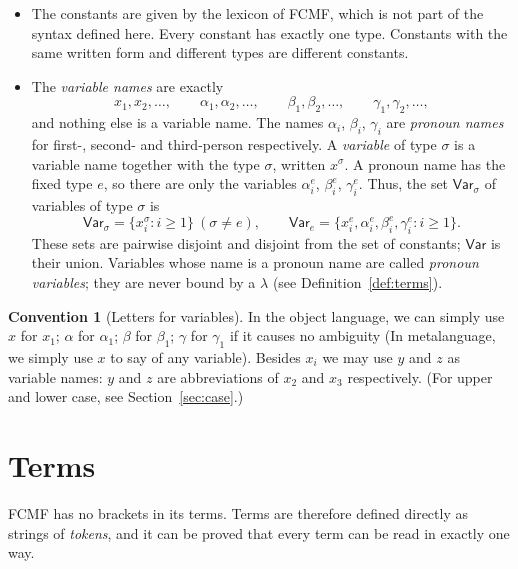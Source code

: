 \documentclass[11pt,a4paper]{article}
\theoremstyle{definition}
\newtheorem{convention}[definition]{Convention}
\theoremstyle{plain}
\newcommand{\Var}{\mathsf{Var}}
\begin{document}
\begin{itemize}[itemsep=0pt]
  \item The constants are given by the lexicon of FCMF, which is not part of the syntax defined here. Every constant has exactly one type. Constants with the same written form and different types are different constants. 
  \item The \emph{variable names} are exactly
  \[
    x_1,x_2,\dots,\qquad
    \alpha_1,\alpha_2,\dots,\qquad
    \beta_1,\beta_2,\dots,\qquad
    \gamma_1,\gamma_2,\dots,
  \]
  and nothing else is a variable name. The names $\alpha_i$, $\beta_i$, $\gamma_i$ are \emph{pronoun names} for first-, second- and third-person respectively. A \emph{variable} of type $\sigma$ is a variable name together with the type $\sigma$, written $x^\sigma$. A pronoun name has the fixed type $e$, so there are only the variables $\alpha_i^{e}$, $\beta_i^{e}$, $\gamma_i^{e}$. Thus, the set $\Var_\sigma$ of variables of type $\sigma$ is
  \[
    \Var_\sigma=\{x_i^\sigma : i\ge1\}\ (\sigma\ne e),\qquad
    \Var_{e}=\{x_i^{e},\alpha_i^{e},\beta_i^{e},\gamma_i^{e} : i\ge1\}.
  \]
  These sets are pairwise disjoint and disjoint from the set of constants; $\Var$ is their union. Variables whose name is a pronoun name are called \emph{pronoun variables}; they are never bound by a $\lambda$ (see Definition~\ref{def:terms}).
\end{itemize}

\begin{convention}[Letters for variables]
In the object language, we can simply use $x$ for $x_1$; $\alpha$ for $\alpha_1$; $\beta$ for $\beta_1$; $\gamma$ for $\gamma_1$ if it causes no ambiguity (In metalanguage, we simply use $x$ to say of any variable). Besides $x_i$ we may use $y$ and $z$ as variable names: $y$ and $z$ are abbreviations of $x_2$ and $x_3$ respectively. (For upper and lower case, see Section~\ref{sec:case}.)
\end{convention}

\section{Terms}\label{sec:terms}

FCMF has no brackets in its terms. Terms are therefore defined directly as strings of \emph{tokens}, and it can be proved that every term can be read in exactly one way.
\end{document}
